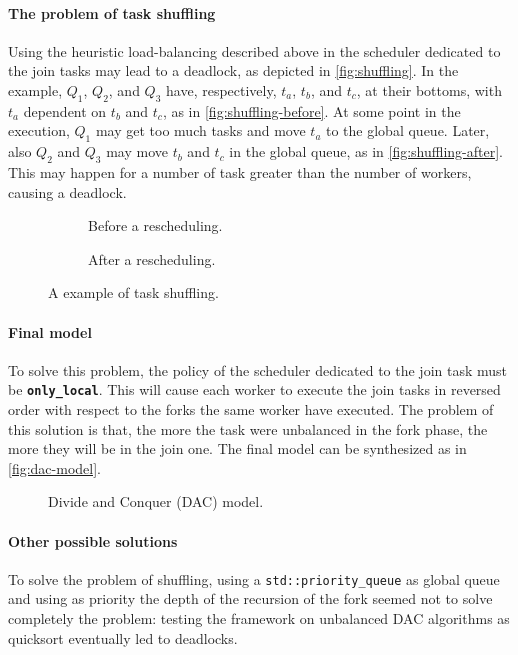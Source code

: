 \documentclass[11pt, a4paper]{article}
\begin{document}
\paragraph{The problem of task shuffling} Using the heuristic load-balancing described above in the scheduler dedicated to the join tasks may lead to a deadlock, as depicted in \autoref{fig:shuffling}. In the example, $Q_1$, $Q_2$, and $Q_3$ have, respectively, $t_a$, $t_b$, and $t_c$, at their bottoms, with $t_a$ dependent on $t_b$ and $t_c$, as in \autoref{fig:shuffling-before}. At some point in the execution, $Q_1$ may get too much tasks and move $t_a$ to the global queue. Later, also $Q_2$ and $Q_3$ may move $t_b$ and $t_c$ in the global queue, as in \autoref{fig:shuffling-after}. This may happen for a number of task greater than the number of workers, causing a deadlock. 
%
\begin{figure}[b]
	\hfill
	\begin{subfigure}{0.4\linewidth}
		\centering
		
		\caption{Before a rescheduling.}
		\label{fig:shuffling-before}
	\end{subfigure}
	\begin{subfigure}{0.4\linewidth}
		\centering
		
		\caption{After a rescheduling.}
		\label{fig:shuffling-after}
	\end{subfigure}%
	\hspace{0.1\linewidth}
	\caption{A example of task shuffling.}
	\label{fig:shuffling}
\end{figure}

\paragraph{Final model} To solve this problem, the policy of the scheduler dedicated to the join task must be {\tt\bfseries only\_local}. This will cause each worker to execute the join tasks in reversed order with respect to the forks the same worker have executed. The problem of this solution is that, the more the task were unbalanced in the fork phase, the more they will be in the join one. The final model can be synthesized as in \autoref{fig:dac-model}.
%
\begin{figure}[t]
	\centering
	
	\caption{Divide and Conquer (DAC) model.}
	\label{fig:dac-model}
\end{figure}

\paragraph{Other possible solutions} To solve the problem of shuffling, using a {\tt std::priority\_queue} as global queue and using as priority the depth of the recursion of the fork seemed not to solve completely the problem: testing the framework on unbalanced DAC algorithms as quicksort eventually led to deadlocks.
\end{document}
